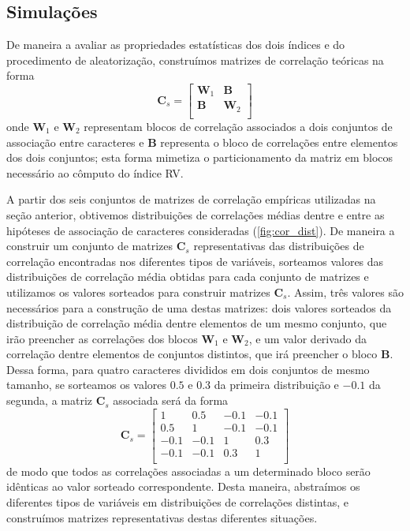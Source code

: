 \documentclass[12pt,]{article}
\begin{document}
\subsection{Simulações}\label{simulacoes}

De maneira a avaliar as propriedades estatísticas dos dois índices e do
procedimento de aleatorização, construímos matrizes de correlação
teóricas na forma \[
\mathbf{C}_{s} =
\begin{bmatrix}
\mathbf{W}_1 & \mathbf{B} \\
\mathbf{B} & \mathbf{W}_2 \\
\end{bmatrix}
\] onde $\mathbf{W}_1$ e $\mathbf{W}_2$ representam blocos de correlação
associados a dois conjuntos de associação entre caracteres e
$\mathbf{B}$ representa o bloco de correlações entre elementos dos dois
conjuntos; esta forma mimetiza o particionamento da matriz em blocos
necessário ao cômputo do índice RV.

A partir dos seis conjuntos de matrizes de correlação empíricas
utilizadas na seção anterior, obtivemos distribuições de correlações
médias dentre e entre as hipóteses de associação de caracteres
consideradas (\autoref{fig:cor_dist}). De maneira a construir um
conjunto de matrizes $\mathbf{C}_{s}$ representativas das distribuições
de correlação encontradas nos diferentes tipos de variáveis, sorteamos
valores das distribuições de correlação média obtidas para cada conjunto
de matrizes e utilizamos os valores sorteados para construir matrizes
$\mathbf{C}_{s}$. Assim, três valores são necessários para a construção
de uma destas matrizes: dois valores sorteados da distribuição de
correlação média dentre elementos de um mesmo conjunto, que irão
preencher as correlações dos blocos $\mathbf{W}_1$ e $\mathbf{W}_2$, e
um valor derivado da correlação dentre elementos de conjuntos distintos,
que irá preencher o bloco $\mathbf{B}$. Dessa forma, para quatro
caracteres divididos em dois conjuntos de mesmo tamanho, se sorteamos os
valores $0.5$ e $0.3$ da primeira distribuição e $-0.1$ da segunda, a
matriz $\mathbf{C}_{s}$ associada será da forma \[
\mathbf{C}_s =
\begin{bmatrix}
1 & 0.5 & -0.1 & -0.1 \\
0.5 & 1 & -0.1 & -0.1 \\
-0.1 & -0.1 & 1 & 0.3 \\
-0.1 & -0.1 & 0.3 & 1 \\
\end{bmatrix}
\] de modo que todos as correlações associadas a um determinado bloco
serão idênticas ao valor sorteado correspondente. Desta maneira,
abstraímos os diferentes tipos de variáveis em distribuições de
correlações distintas, e construímos matrizes representativas destas
diferentes situações.
\end{document}
